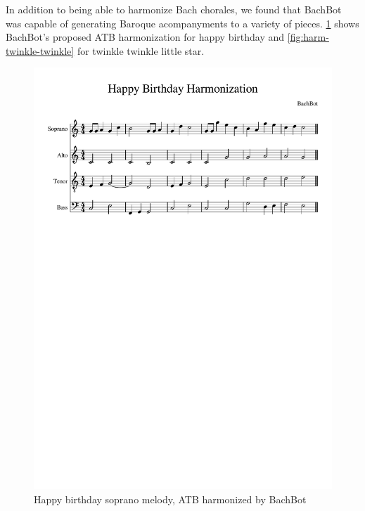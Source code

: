In addition to being able to harmonize Bach chorales, we found that BachBot was
capable of generating Baroque acompanyments to a variety of pieces.
\cref{fig:harm-happy-birthday} shows BachBot's proposed ATB harmonization for
happy birthday and \cref{fig:harm-twinkle-twinkle}
for twinkle twinkle little star.

\begin{figure}[tb]
  \centering
  \includegraphics[trim={0 19cm 0 3.7cm},clip,width=0.9\linewidth]{happy-birthday-score.pdf}
  \caption{Happy birthday soprano melody, ATB harmonized by BachBot}
  \label{fig:harm-happy-birthday}
\end{figure}

